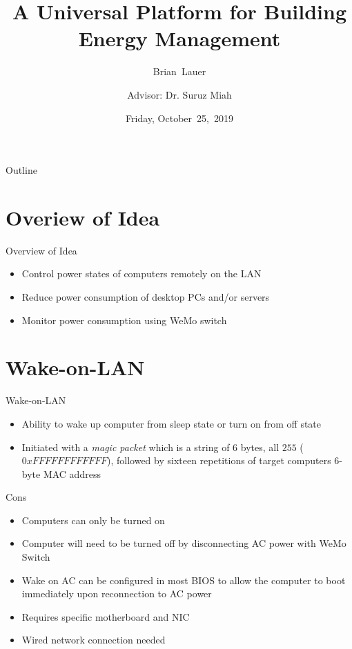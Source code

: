 \documentclass{beamer}
\title[]{A Universal Platform for Building Energy Management}
\author[B.~Lauer]{Brian~Lauer\\\and
Advisor: Dr. Suruz Miah}
\institute[Bradley University] %
{
  Department of Electrical and Computer Engineering\\
  Bradley University\\
  1501 W. Bradley Avenue\\
  Peoria, IL, 61625, USA
}
\date[October~25,~2019]{Friday, October~25,~2019}
\begin{document}
\begin{frame}
  \titlepage
\end{frame}

\begin{frame}{Outline}
  \tableofcontents
\end{frame}

\section{Overiew of Idea}

\begin{frame}{Overview of Idea}
\begin{itemize}
\item Control power states of computers remotely on the LAN
\item Reduce power consumption of desktop PCs and/or servers
\item Monitor power consumption using WeMo switch
\end{itemize}
\end{frame}

\section{Wake-on-LAN}
\begin{frame}{Wake-on-LAN}
\begin{itemize}
\item Ability to wake up computer from sleep state or turn on from off state
\item Initiated with a \textit{magic packet} which is a string of $6$ bytes, all $255$ ($0xFFFFFFFFFFFF$), followed by sixteen repetitions of target computers 6-byte MAC address
\end{itemize}
\begin{block}{Cons}
\begin{itemize}
\item Computers can only be turned on
\item Computer will need to be turned off by disconnecting AC power with WeMo Switch
\item Wake on AC can be configured in most BIOS to allow the computer to boot immediately upon reconnection to AC power
\item Requires specific motherboard and NIC
\item Wired network connection needed
\end{itemize}
\end{block}
\end{frame}
\end{document}

